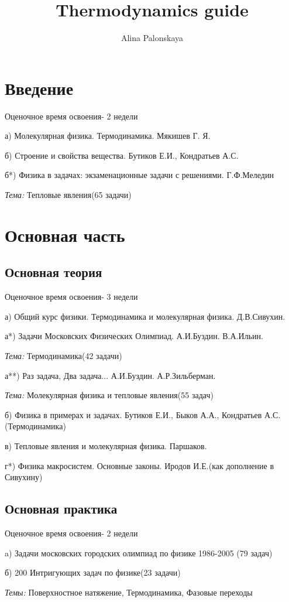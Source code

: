 \documentclass{article}
\title{Thermodynamics guide}
\author{Alina Palonskaya}
\date{}
\begin{document}
\maketitle

\Large\section{Введение}
\large{
Оценочное время освоения- 2 недели

а) Молекулярная физика. Термодинамика. Мякишев Г. Я.

б) Строение и свойства вещества. Бутиков Е.И., Кондратьев А.С.

б*) Физика в задачах: экзаменационные задачи с решениями. Г.Ф.Меледин

\textit{Тема:} Тепловые явления(65 задачи)
}
\Large\section{Основная часть}
\large{
\subsection{Основная теория}
Оценочное время освоения- 3 недели

а) Общий курс физики. Термодинамика и молекулярная физика. Д.В.Сивухин.

а*) Задачи Московских Физических Олимпиад. А.И.Буздин. В.А.Ильин.

\textit{Тема:} Термодинамика(42 задачи)

а**) Раз задача, Два задача... А.И.Буздин. А.Р.Зильберман.

\textit{Тема:} Молекулярная физика и тепловые явления(55 задач)

б) Физика в примерах и задачах. Бутиков Е.И., Быков А.А., Кондратьев А.С. (Термодинамика)

в) Тепловые явления и молекулярная физика. Паршаков.

г*) Физика макросистем. Основные законы. Иродов И.Е.(как дополнение в Сивухину)

\subsection{Основная практика}
Оценочное время освоения- 2 недели

a) Задачи московских городских олимпиад по физике 1986-2005 (79 задач)

б) 200 Интригующих задач по физике(23 задачи)

\textit{Темы:} Поверхностное натяжение, Термодинамика, Фазовые переходы
}
\end{document}
